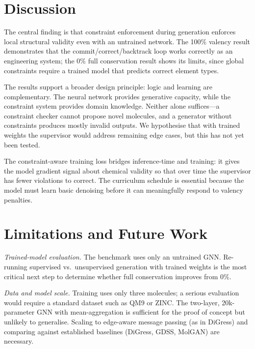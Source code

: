 \documentclass[11pt]{article}
\begin{document}
\section{Discussion}

The central finding is that constraint enforcement during generation
enforces local structural validity even with an untrained network. The
100\% valency result demonstrates that the commit/correct/backtrack
loop works correctly as an engineering system; the 0\% full conservation
result shows its limits, since global constraints require a trained
model that predicts correct element types.

The results support a broader design principle: logic and learning are
complementary. The neural network provides generative capacity, while
the constraint system provides domain knowledge. Neither alone
suffices---a constraint checker cannot propose novel molecules, and a
generator without constraints produces mostly invalid outputs. We
hypothesise that with trained weights the supervisor would address
remaining edge cases, but this has not yet been tested.

The constraint-aware training loss bridges inference-time and training:
it gives the model gradient signal about chemical validity so that over
time the supervisor has fewer violations to correct. The curriculum
schedule is essential because the model must learn basic denoising
before it can meaningfully respond to valency penalties.

\section{Limitations and Future Work}
\label{sec:future}

\emph{Trained-model evaluation.} The benchmark uses only an untrained
GNN. Re-running supervised vs.\ unsupervised generation with trained
weights is the most critical next step to determine whether full
conservation improves from 0\%.

\emph{Data and model scale.} Training uses only three molecules; a
serious evaluation would require a standard dataset such as
QM9 or ZINC. The
two-layer, 20k-parameter GNN with mean-aggregation is sufficient for
the proof of concept but unlikely to generalise. Scaling to edge-aware
message passing (as in DiGress) and comparing
against established baselines (DiGress, GDSS, MolGAN) are necessary.
\end{document}
